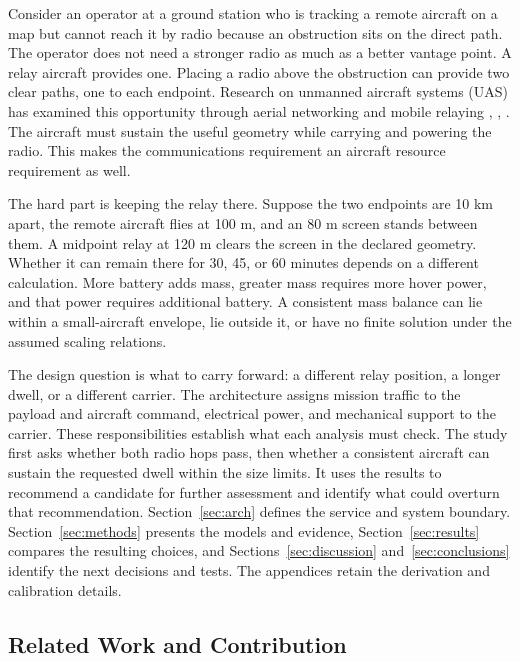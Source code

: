 \documentclass[twocolumn,letterpaper]{IEEEAerospaceCLS}
\begin{document}
Consider an operator at a ground station who is tracking a remote aircraft on a map but cannot reach it by radio because an obstruction sits on the direct path. The operator does not need a stronger radio as much as a better vantage point. A relay aircraft provides one. Placing a radio above the obstruction can provide two clear paths, one to each endpoint. Research on unmanned aircraft systems (UAS) has examined this opportunity through aerial networking and mobile relaying \cite{zengmag}, \cite{tutorial}, \cite{zengrelay}. The aircraft must sustain the useful geometry while carrying and powering the radio. This makes the communications requirement an aircraft resource requirement as well.

The hard part is keeping the relay there. Suppose the two endpoints are 10 km apart, the remote aircraft flies at 100 m, and an 80 m screen stands between them. A midpoint relay at 120 m clears the screen in the declared geometry. Whether it can remain there for 30, 45, or 60 minutes depends on a different calculation. More battery adds mass, greater mass requires more hover power, and that power requires additional battery. A consistent mass balance can lie within a small-aircraft envelope, lie outside it, or have no finite solution under the assumed scaling relations.

The design question is what to carry forward: a different relay position, a longer dwell, or a different carrier. The architecture assigns mission traffic to the payload and aircraft command, electrical power, and mechanical support to the carrier. These responsibilities establish what each analysis must check. The study first asks whether both radio hops pass, then whether a consistent aircraft can sustain the requested dwell within the size limits. It uses the results to recommend a candidate for further assessment and identify what could overturn that recommendation. Section~\ref{sec:arch} defines the service and system boundary. Section~\ref{sec:methods} presents the models and evidence, Section~\ref{sec:results} compares the resulting choices, and Sections~\ref{sec:discussion} and~\ref{sec:conclusions} identify the next decisions and tests. The appendices retain the derivation and calibration details.

\subsection{Related Work and Contribution}
\end{document}
